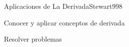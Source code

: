 \begin{syllabus}
\begin{unit}{Aplicaciones de La Derivada}{Stewart99}{8}
\begin{unitgoals}
	\item Conocer y aplicar conceptos de derivada
	\item Resolver problemas
\end{unitgoals}
\end{unit}

\begin{coursebibliography}
\end{coursebibliography}
\end{syllabus}


